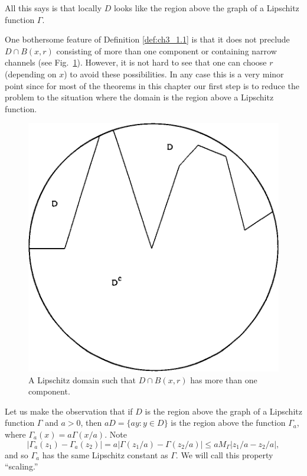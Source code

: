 All this says is that locally $D$ looks like the region above the graph of a Lipschitz function $\Gamma$.

One bothersome feature of Definition \ref{def:ch3_1.1} is that it does not preclude $D \cap B(x,r)$ consisting of more than one component or containing narrow channels (see Fig.\ \ref{fig:ch3_1.1}). However, it is not hard to see that one can choose $r$ (depending on $x$) to avoid these possibilities. In any case this is a very minor point since for most of the theorems in this chapter our first step is to reduce the problem to the situation where the domain is the region above a Lipschitz function.

\smallskip
\begin{figure}[ht]
    \centering\includegraphics{Images/Img5.png}
    \caption{A Lipschitz domain such that $D\cap B(x,r)$ has more than one com\-ponent.}
    \label{fig:ch3_1.1}
\end{figure}

Let us make the observation that if $D$ is the region above the graph of a Lipschitz function $\Gamma$ and $a > 0$, then $aD = \{ay : y \in D\}$ is the region above the function $\Gamma_a$, where $\Gamma_a(x) = a\Gamma(x/a)$. Note
\[
    |\Gamma_a(z_1) - \Gamma_a(z_2)| = a|\Gamma(z_1/a) - \Gamma(z_2/a)| \leq aM_\Gamma|z_1/a - z_2/a|,
\]
and so $\Gamma_a$ has the same Lipschitz constant as $\Gamma$. We will call this property ``scaling.''

